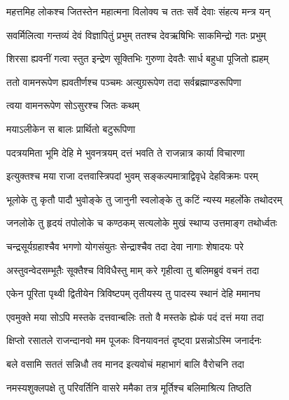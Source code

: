 \twolineshloka
{महत्तमिह लोकश्च जितस्तेन महात्मना}
{विलोक्य च ततः सर्वे देवाः संहत्य मन्त्र यन्} %

\twolineshloka
{सवर्मिलित्वा गन्तव्यं देवं विज्ञापितुं प्रभुम्}
{ततश्च देवऋषिभिः साकमिन्द्रो गतः प्रभुम्} %

\twolineshloka
{शिरसा ह्यवनीं गत्वा स्तुत इन्द्रेण सूक्तिभिः}
{गुरुणा देवतैः सार्ध बहुधा पूजितो ह्यहम्} %

\twolineshloka
{ततो वामनरूपेण ह्यवतीर्णश्च पञ्चमः}
{अत्युग्ररूपेण तदा सर्वब्रह्माण्डरूपिणा} %



\onelineshloka
{त्वया वामनरूपेण सोऽसुरश्च जितः कथम्} %



\onelineshloka
{मयाऽलीकेन स बालः प्रार्थितो बटुरूपिणा} %

\twolineshloka
{पदत्रयमिता भूमि देहि मे भुवनत्रयम्}
{दत्तं भवति ते राजन्नात्र कार्या विचारणा} %

\twolineshloka
{इत्युक्तश्च मया राजा दत्तवास्त्रिपदां भुवम्}
{सङ्कल्पमात्राद्विवृधे देहविक्रमः परम्} %

\twolineshloka
{भूलोके तु कृतौ पादौ भुवोङ्के तु जानुनी}
{स्वलोङ्के तु कटिं न्यस्य महर्लोके तथोदरम्} %

\twolineshloka
{जनलोके तु हृदयं तपोलोके च कण्ठकम्}
{सत्यलोके मुखं स्थाप्य उत्तमाङ्ग तथोर्ध्वतः} %

\twolineshloka
{चन्द्रसूर्यग्रहाश्चैव भगणो योगसंयुतः}
{सेन्द्राश्चैव तदा देवा नागाः शेषादयः परे} %

\twolineshloka
{अस्तुवन्वेदसम्भूतैः सूक्तैश्च विविधैस्तु माम्}
{करे गृहीत्वा तु बलिमब्रुवं वचनं तदा} %

\twolineshloka
{एकेन पूरिता पृथ्वी द्वितीयेन त्रिविष्टपम्}
{तृतीयस्य तु पादस्य स्थानं देहि ममानघ} %

\twolineshloka
{एवमुक्ते मया सोऽपि मस्तके दत्तवान्बलिः}
{ततो वै मस्तके ह्येकं पदं दत्तं मया तदा} %

\twolineshloka
{क्षिप्तो रसातले राजन्दानवो मम पूजकः}
{विनयावनतं दृष्ट्वा प्रसन्नोऽस्मि जनार्दनः} %

\twolineshloka
{बले वसामि सततं सन्निधौ तव मानद}
{इत्यवोचं महाभागं बालि वैरोचनि तदा} %

\twolineshloka
{नमस्यशुक्लपक्षे तु परिवर्तिनि वासरे}
{ममैका तत्र मूर्तिश्च बलिमाश्रित्य तिष्ठति} %

